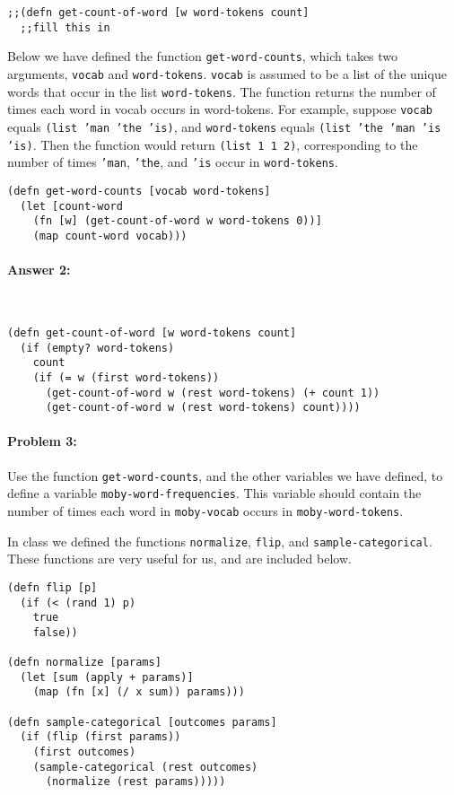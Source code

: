 \documentclass[12pt, letterpaper]{article}
\begin{document}
\begin{lstlisting}
;;(defn get-count-of-word [w word-tokens count]
  ;;fill this in
\end{lstlisting}

Below we have defined the function \texttt{get-word-counts}, which
takes two arguments, \texttt{vocab} and
\texttt{word-tokens}. \texttt{vocab} is assumed to be a list of the
unique words that occur in the list \texttt{word-tokens}. The function
returns the number of times each word in vocab occurs in
word-tokens. For example, suppose \texttt{vocab} equals \texttt{(list
  'man 'the 'is)}, and \texttt{word-tokens} equals \texttt{(list 'the
  'man 'is 'is)}. Then the function would return \texttt{(list 1 1
  2)}, corresponding to the number of times \texttt{'man},
\texttt{'the}, and \texttt{'is} occur in \texttt{word-tokens}.

\begin{lstlisting}
(defn get-word-counts [vocab word-tokens]
  (let [count-word 
    (fn [w] (get-count-of-word w word-tokens 0))]
    (map count-word vocab)))
\end{lstlisting}

\paragraph{Answer 2:}~\begin{lstlisting}
(defn get-count-of-word [w word-tokens count]
  (if (empty? word-tokens)
    count
    (if (= w (first word-tokens))
      (get-count-of-word w (rest word-tokens) (+ count 1))
      (get-count-of-word w (rest word-tokens) count))))
\end{lstlisting}

\hrulefill
\paragraph{Problem 3:}

Use the function \texttt{get-word-counts}, and the other variables we have
defined, to define a variable \texttt{moby-word-frequencies}. This variable
should contain the number of times each word in \texttt{moby-vocab} occurs in
\texttt{moby-word-tokens}.

In class we defined the functions \texttt{normalize}, \texttt{flip},
and \texttt{sample-categorical}. These functions are very useful for
us, and are included below.

\begin{lstlisting}
(defn flip [p]
  (if (< (rand 1) p)
    true
    false))

(defn normalize [params]
  (let [sum (apply + params)]
    (map (fn [x] (/ x sum)) params)))

(defn sample-categorical [outcomes params]
  (if (flip (first params))
    (first outcomes)
    (sample-categorical (rest outcomes) 
      (normalize (rest params)))))
\end{lstlisting}
\end{document}
